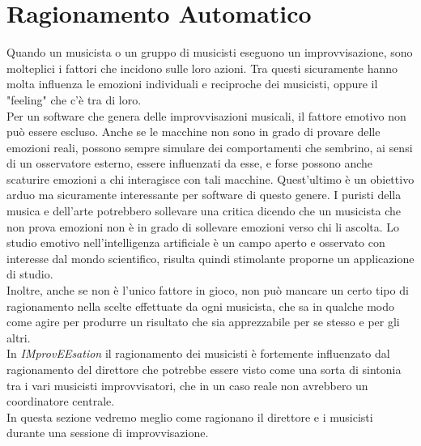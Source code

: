 \section{Ragionamento Automatico}
Quando un musicista o un gruppo di musicisti eseguono un
improvvisazione, sono molteplici i fattori che incidono sulle loro azioni. 
Tra questi sicuramente hanno molta influenza le emozioni
individuali e reciproche dei musicisti, oppure il "feeling" che c'è tra
di loro.\\
Per un software che genera delle improvvisazioni musicali, il fattore 
emotivo non può essere escluso.
Anche se le macchine non sono in grado
di provare delle emozioni reali, possono sempre simulare dei
comportamenti che sembrino, ai sensi di un osservatore esterno, 
essere influenzati da esse, e forse possono anche scaturire emozioni a chi 
interagisce con tali
macchine. Quest'ultimo è un obiettivo arduo ma sicuramente interessante
per software di questo genere. I puristi della musica e dell'arte
potrebbero sollevare una critica dicendo che un musicista che non prova
emozioni non è in grado di sollevare emozioni verso chi li ascolta.
Lo studio emotivo nell'intelligenza artificiale è un campo aperto e
osservato con interesse dal mondo scientifico, risulta quindi stimolante
proporne un applicazione di studio.\\

Inoltre, anche se non è l'unico fattore in gioco, 
non può mancare un certo tipo di ragionamento
nella scelte effettuate da ogni musicista, che sa in qualche modo come
agire per produrre un risultato che sia apprezzabile per se stesso e per gli
altri.\\
In \emph{IMprovEEsation} il ragionamento dei musicisti è fortemente influenzato
dal ragionamento del direttore che potrebbe essere visto come una sorta
di sintonia tra i vari musicisti improvvisatori, che in
un caso reale non avrebbero un coordinatore centrale.\\
In questa sezione vedremo meglio come ragionano il direttore e i
musicisti durante una sessione di improvvisazione.
\label{thinking}
